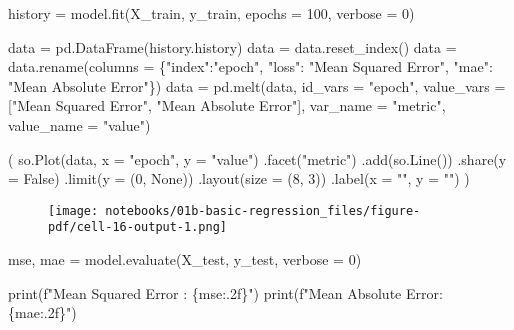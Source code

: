 \documentclass[
  letterpaper,
  DIV=11,
  numbers=noendperiod]{scrreprt}
\newenvironment{Shaded}{\begin{snugshade}}{\end{snugshade}}
\newcommand{\BuiltInTok}[1]{\textcolor[rgb]{0.00,0.23,0.31}{#1}}
\newcommand{\DecValTok}[1]{\textcolor[rgb]{0.68,0.00,0.00}{#1}}
\newcommand{\NormalTok}[1]{\textcolor[rgb]{0.00,0.23,0.31}{#1}}
\newcommand{\OperatorTok}[1]{\textcolor[rgb]{0.37,0.37,0.37}{#1}}
\newcommand{\SpecialCharTok}[1]{\textcolor[rgb]{0.37,0.37,0.37}{#1}}
\newcommand{\SpecialStringTok}[1]{\textcolor[rgb]{0.13,0.47,0.30}{#1}}
\newcommand{\StringTok}[1]{\textcolor[rgb]{0.13,0.47,0.30}{#1}}
\newcommand{\VariableTok}[1]{\textcolor[rgb]{0.07,0.07,0.07}{#1}}
\begin{document}
\begin{Shaded}
\begin{Highlighting}[]
\NormalTok{history }\OperatorTok{=}\NormalTok{ model.fit(X\_train, y\_train, epochs }\OperatorTok{=} \DecValTok{100}\NormalTok{, verbose }\OperatorTok{=} \DecValTok{0}\NormalTok{)}

\NormalTok{data }\OperatorTok{=}\NormalTok{ pd.DataFrame(history.history)}
\NormalTok{data }\OperatorTok{=}\NormalTok{ data.reset\_index()}
\NormalTok{data }\OperatorTok{=}\NormalTok{ data.rename(columns }\OperatorTok{=}\NormalTok{ \{}\StringTok{"index"}\NormalTok{:}\StringTok{"epoch"}\NormalTok{, }
                              \StringTok{"loss"}\NormalTok{: }\StringTok{"Mean Squared Error"}\NormalTok{, }
                              \StringTok{"mae"}\NormalTok{: }\StringTok{"Mean Absolute Error"}\NormalTok{\})}
\NormalTok{data }\OperatorTok{=}\NormalTok{ pd.melt(data, }
\NormalTok{               id\_vars }\OperatorTok{=} \StringTok{"epoch"}\NormalTok{, }
\NormalTok{               value\_vars }\OperatorTok{=}\NormalTok{ [}\StringTok{"Mean Squared Error"}\NormalTok{, }\StringTok{"Mean Absolute Error"}\NormalTok{],}
\NormalTok{               var\_name }\OperatorTok{=} \StringTok{"metric"}\NormalTok{,}
\NormalTok{               value\_name }\OperatorTok{=} \StringTok{"value"}\NormalTok{)}

\NormalTok{(}
\NormalTok{    so.Plot(data, x }\OperatorTok{=} \StringTok{"epoch"}\NormalTok{, y }\OperatorTok{=} \StringTok{"value"}\NormalTok{)}
\NormalTok{    .facet(}\StringTok{"metric"}\NormalTok{)}
\NormalTok{    .add(so.Line())}
\NormalTok{    .share(y }\OperatorTok{=} \VariableTok{False}\NormalTok{)}
\NormalTok{    .limit(y }\OperatorTok{=}\NormalTok{ (}\DecValTok{0}\NormalTok{, }\VariableTok{None}\NormalTok{))}
\NormalTok{    .layout(size }\OperatorTok{=}\NormalTok{ (}\DecValTok{8}\NormalTok{, }\DecValTok{3}\NormalTok{))}
\NormalTok{    .label(x }\OperatorTok{=} \StringTok{""}\NormalTok{, y }\OperatorTok{=} \StringTok{""}\NormalTok{)}
\NormalTok{)}
\end{Highlighting}
\end{Shaded}

\begin{figure}[H]

{\centering \texttt{[image: notebooks/01b-basic-regression\_files/figure-pdf/cell-16-output-1.png]}

}

\end{figure}

\begin{Shaded}
\begin{Highlighting}[]
\NormalTok{mse, mae }\OperatorTok{=}\NormalTok{ model.evaluate(X\_test, y\_test, verbose }\OperatorTok{=} \DecValTok{0}\NormalTok{)}

\BuiltInTok{print}\NormalTok{(}\SpecialStringTok{f"Mean Squared Error : }\SpecialCharTok{\{}\NormalTok{mse}\SpecialCharTok{:.2f\}}\SpecialStringTok{"}\NormalTok{)}
\BuiltInTok{print}\NormalTok{(}\SpecialStringTok{f"Mean Absolute Error: }\SpecialCharTok{\{}\NormalTok{mae}\SpecialCharTok{:.2f\}}\SpecialStringTok{"}\NormalTok{)}
\end{Highlighting}
\end{Shaded}
\end{document}
